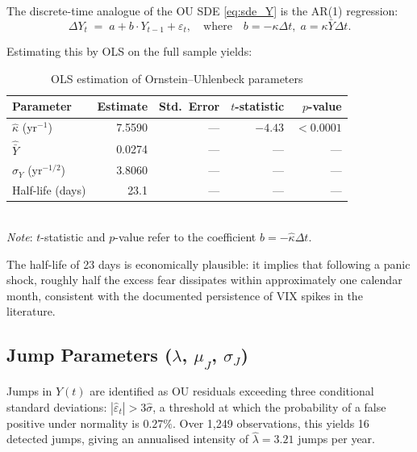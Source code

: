 \documentclass[12pt,a4paper]{article}
\theoremstyle{definition}
\theoremstyle{remark}
\begin{document}
The discrete-time analogue of the OU SDE \eqref{eq:sde_Y} is the AR(1)
regression:
\begin{equation}
  \Delta Y_t \;=\; a + b \cdot Y_{t-1} + \varepsilon_t,
  \quad \text{where}\quad b = -\kappa\Delta t,\; a = \kappa\bar{Y}\Delta t.
\end{equation}

Estimating this by OLS on the full sample yields:

\begin{table}[H]
  \centering
  \caption{OLS estimation of Ornstein--Uhlenbeck parameters}
  \label{tab:ou}
  \begin{tabular}{lrrrr}
    \toprule
    Parameter & Estimate & Std.\ Error & $t$-statistic & $p$-value \\
    \midrule
    $\hat{\kappa}$ (yr$^{-1}$) & 7.5590 & --- & $-4.43$ & $<0.0001$ \\
    $\hat{\bar{Y}}$             & 0.0274 & --- & ---      & ---       \\
    $\hat{\sigma}_Y$ (yr$^{-1/2}$) & 3.8060 & --- & ---  & ---       \\
    Half-life (days)            & 23.1   & --- & ---      & ---       \\
    \bottomrule
  \end{tabular}
  \smallskip\\
  \small\textit{Note}: $t$-statistic and $p$-value refer to the coefficient
  $b = -\hat{\kappa}\Delta t$.
\end{table}

The half-life of 23 days is economically plausible: it implies that
following a panic shock, roughly half the excess fear dissipates within
approximately one calendar month, consistent with the documented
persistence of VIX spikes in the literature.

\subsection{Jump Parameters ($\lambda$, $\mu_J$, $\sigma_J$)}

Jumps in $Y(t)$ are identified as OU residuals exceeding three
conditional standard deviations: $|\hat{\varepsilon}_t| > 3\hat{\sigma}$,
a threshold at which the probability of a false positive under normality
is $0.27\%$. Over 1{,}249 observations, this yields 16 detected jumps,
giving an annualised intensity of $\hat{\lambda} = 3.21$ jumps per year.
\end{document}
